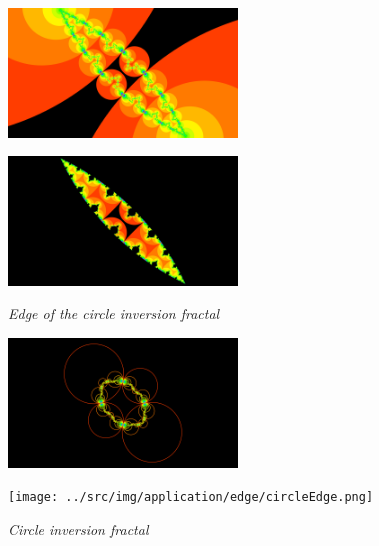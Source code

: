 \documentclass[uplatex, dvipdfmx]{article}
\begin{document}
\begin{figure}[htbp]
 \begin{minipage}[t]{0.5\hsize}
  \center
  \includegraphics[height=1.35in, keepaspectratio]{../src/img/application/internal/schottky.png}
  \subcaption{\textit{}}
  \label{fig:schottkyAll}
  \hspace*{\fill}
 \end{minipage}
 \begin{minipage}[t]{0.5\hsize}
  \center
  \includegraphics[height=1.35in, keepaspectratio]{../src/img/application/internal/schottkyEdge.png}
  \subcaption{\textit{}}
  \label{fig:schottkyEdge}
  \hspace*{\fill}
 \end{minipage}
 \caption{\textit{Edge of the circle inversion fractal}}
 \label{fig:schottkyDivide}
\end{figure}

\begin{figure}[htbp]
 \begin{minipage}[t]{0.5\hsize}
  \center
  \includegraphics[height=1.35in, keepaspectratio]{../src/img/application/edge/circles.png}
  \subcaption{\textit{}}
  \label{}
  \hspace*{\fill}
 \end{minipage}
 \begin{minipage}[t]{0.5\hsize}
  \center
  \texttt{[image: ../src/img/application/edge/circleEdge.png]}
  \subcaption{\textit{}}
  \label{}
  \hspace*{\fill}
 \end{minipage}
 \caption{\textit{Circle inversion fractal}}
 \label{fig:circleEdge}
\end{figure}
\end{document}
